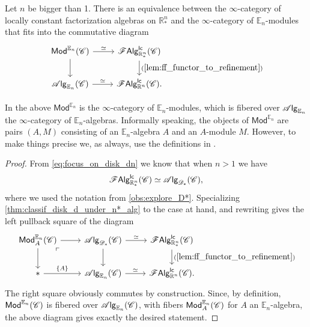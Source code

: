 \documentclass[../text]{subfiles}
\begin{document}
\begin{theorem}\label{thm:classif_Rn*}
    Let $n$ be bigger than 1. There is an equivalence between the $\infty$-category of locally constant factorization algebras on $\mathbb{R}^n_*$ and the $\infty$-category of $\mathbb{E}_n$-modules that fits into the commutative diagram
    \begin{equation}
        \begin{tikzcd}
            \mathsf{Mod}^{\mathbb{E}_n} (\catC) \arrow[r, "\simeq"] \arrow[d] & \lcfa_{\mathbb{R}^n_*} (\catC) \arrow[d, "(\ref{lem:ff_functor_to_refinement})"] \\
            \alg{\mathbb{E}_n} (\catC) \arrow[r, "\simeq"] & \lcfa_{\mathbb{R}^n} (\catC).
        \end{tikzcd}
    \end{equation}
\end{theorem}

\begin{remark}
    In the above $\mathsf{Mod}^{\mathbb{E}_n}$ is the $\infty$-category of $\mathbb{E}_n$-modules, which is fibered over $\mathscr{A} \mathsf{lg}_{\mathbb{E}_n}$ the $\infty$-category of $\mathbb{E}_n$-algebras. Informally speaking, the objects of $\mathsf{Mod}^{\mathbb{E}_n}$ are pairs $(A, M)$ consisting of an $\mathbb{E}_n$-algebra $A$ and an $A$-module $M$. However, to make things precise we, as always, use the definitions in \cite[ch.3]{lurie_ha}.
\end{remark}


\begin{proof}
    From \cref{eq:focus_on_disk_dn} we know that when $n > 1$ we have
    \begin{equation}
        \mathscr{F} \mathsf{Alg}^{\mathsf{lc}}_{\mathbb{R}^n_*} (\mathscr{C}) \simeq \mathscr{A} \mathsf{lg}_{\mathscr{D}_*} (\mathscr{C}),
    \end{equation}
    where we used the notation from \cref{obs:explore_D*}. Specializing \cref{thm:classif_disk_d_under_n*_alg} to the case at hand, and rewriting gives the left pullback square of the diagram
    \begin{equation}
        \begin{tikzcd}
            \mathsf{Mod}^{\mathbb{E}_n}_A (\catC) \arrow[dr, phantom, "\ulcorner", very near start] \arrow[r] \arrow[d] & \alg{\mathscr{D}_*} (\catC) \arrow[d] \arrow[r, "\simeq"] & \lcfa_{\mathbb{R}^n_*} (\catC) \arrow[d, "(\ref{lem:ff_functor_to_refinement})"] \\
            * \arrow[r, "\{A\}"] & \alg{\mathbb{E}_n} (\catC) \arrow[r, "\simeq"] & \lcfa_{\mathbb{R}^n} (\catC).
        \end{tikzcd}
    \end{equation}
    The right square obviously commutes by construction. Since, by definition, $\mathsf{Mod}^{\mathbb{E}_n} (\mathscr{C})$ is fibered over $\mathscr{A} \mathsf{lg}_{\mathbb{E}_n} (\mathscr{C})$, with fibers $\mathsf{Mod}^{\mathbb{E}_n}_A (\mathscr{C})$ for $A$ an $\mathbb{E}_n$-algebra, the above diagram gives exactly the desired statement.
\end{proof}
\end{document}
